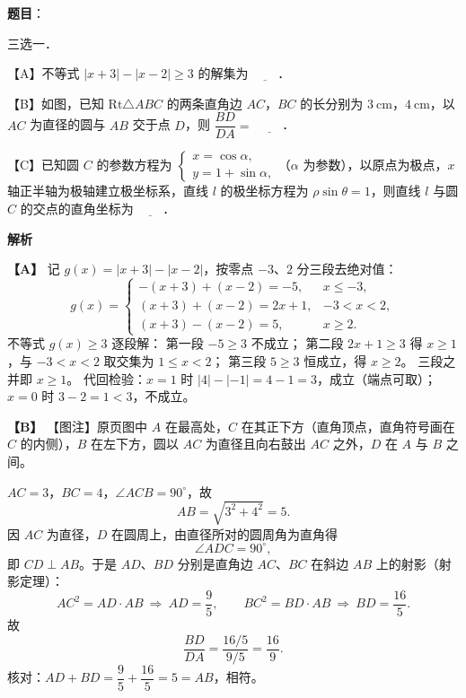 \begin{answer}

\textbf{题目}：

三选一．

【A】不等式 $|x+3|-|x-2|\geqslant 3$ 的解集为 $\underline{\qquad}$．

【B】如图，已知 $\mathrm{Rt}\triangle ABC$ 的两条直角边 $AC$，$BC$ 的长分别为 $3\ \mathrm{cm}$，$4\ \mathrm{cm}$，以 $AC$ 为直径的圆与 $AB$ 交于点 $D$，则 $\dfrac{BD}{DA}=$ $\underline{\qquad}$．
\nopagebreak[4]
\begin{center}\end{center}
\nopagebreak[4]
【C】已知圆 $C$ 的参数方程为 $\begin{cases}x=\cos\alpha,\\[2pt]y=1+\sin\alpha,\end{cases}$（$\alpha$ 为参数），以原点为极点，$x$ 轴正半轴为极轴建立极坐标系，直线 $l$ 的极坐标方程为 $\rho\sin\theta=1$，则直线 $l$ 与圆 $C$ 的交点的直角坐标为 $\underline{\qquad}$．

\textbf{解析}

\textbf{【A】} 记 $g(x)=|x+3|-|x-2|$，按零点 $-3$、$2$ 分三段去绝对值：
\nopagebreak[4]
\[g(x)=\begin{cases}
-(x+3)+(x-2)=-5, & x\leqslant -3,\\[2pt]
(x+3)+(x-2)=2x+1, & -3<x<2,\\[2pt]
(x+3)-(x-2)=5, & x\geqslant 2.
\end{cases}\]
不等式 $g(x)\geqslant 3$ 逐段解：
第一段 $-5\geqslant 3$ 不成立；
第二段 $2x+1\geqslant 3$ 得 $x\geqslant 1$，与 $-3<x<2$ 取交集为 $1\leqslant x<2$；
第三段 $5\geqslant 3$ 恒成立，得 $x\geqslant 2$。
三段之并即 $x\geqslant 1$。
代回检验：$x=1$ 时 $|4|-|-1|=4-1=3$，成立（端点可取）；$x=0$ 时 $3-2=1<3$，不成立。

\textbf{【B】} 【图注】原页图中 $A$ 在最高处，$C$ 在其正下方（直角顶点，直角符号画在 $C$ 的内侧），$B$ 在左下方，圆以 $AC$ 为直径且向右鼓出 $AC$ 之外，$D$ 在 $A$ 与 $B$ 之间。

$AC=3$，$BC=4$，$\angle ACB=90^\circ$，故
\nopagebreak[4]
\[AB=\sqrt{3^2+4^2}=5.\]
因 $AC$ 为直径，$D$ 在圆周上，由直径所对的圆周角为直角得
\nopagebreak[4]
\[\angle ADC=90^\circ,\]
即 $CD\perp AB$。于是 $AD$、$BD$ 分别是直角边 $AC$、$BC$ 在斜边 $AB$ 上的射影（射影定理）：
\nopagebreak[4]
\[AC^2=AD\cdot AB\ \Longrightarrow\ AD=\frac{9}{5},\qquad BC^2=BD\cdot AB\ \Longrightarrow\ BD=\frac{16}{5}.\]
故
\nopagebreak[4]
\[\frac{BD}{DA}=\frac{16/5}{9/5}=\frac{16}{9}.\]
核对：$AD+BD=\dfrac95+\dfrac{16}{5}=5=AB$，相符。


\end{answer}
